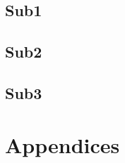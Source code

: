 \documentclass[a4paper, 12pt]{article}
\begin{document}
\subsection{Sub1}


\subsection{Sub2}


\subsection{Sub3}



\pagebreak


\section{Appendices}


\pagebreak


{} %
\printbibliography
\pagebreak


\end{document}
